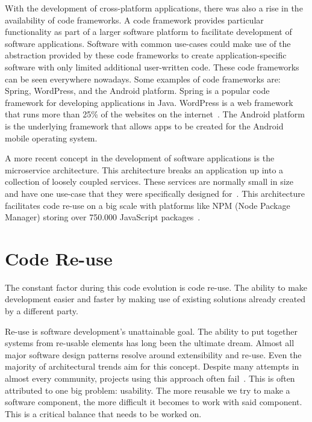 With the development of cross-platform applications, there was also a rise in the availability of code frameworks. A code framework provides particular functionality as part of a larger software platform to facilitate development of software applications. Software with common use-cases could make use of the abstraction provided by these code frameworks to create application-specific software with only limited additional user-written code. These code frameworks can be seen everywhere nowadays. Some examples of code frameworks are: Spring, WordPress, and the Android platform. Spring is a popular code framework for developing applications in Java. WordPress is a web framework that runs more than 25\% of the websites on the internet~\cite{ewer201414}. The Android platform is the underlying framework that allows apps to be created for the Android mobile operating system.

A more recent concept in the development of software applications is the microservice architecture. This architecture breaks an application up into a collection of loosely coupled services. These services are normally small in size and have one use-case that they were specifically designed for~\cite{thones2015microservices}. This architecture facilitates code re-use on a big scale with platforms like NPM (Node Package Manager) storing over 750.000 JavaScript packages~\cite{npmstatistics}.

\section{Code Re-use}

The constant factor during this code evolution is code re-use. The ability to make development easier and faster by making use of existing solutions already created by a different party.

Re-use is software development’s unattainable goal. The ability to put together systems from re-usable elements has long been the ultimate dream. Almost all major software design patterns resolve around extensibility and re-use. Even the majority of architectural trends aim for this concept. Despite many attempts in almost every community, projects using this approach often fail~\cite{reusedreamdead}.
This is often attributed to one big problem: usability. The more reusable we try to make a software component, the more difficult it becomes to work with said component. This is a critical balance that needs to be worked on.

